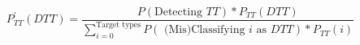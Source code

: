 \begin{multicols*}{2}


\end{multicols*}

\begin{equation}
\label{eq:bayesian}
P_{TT}^{'}(DTT) = \frac{ P(\text{Detecting }TT) * P_{TT}(DTT)} {\sum_{i=0}^{\text{Target types}}P(\text{ (Mis)Classifying } i \text{ as } DTT) * P_{TT}(i)}
\end{equation}


